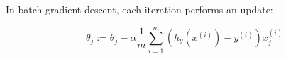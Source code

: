 \documentclass{article}
\begin{document}
{\Large


In batch gradient descent, each iteration performs an update:


\begin{equation}
 \theta_j := \theta_j - \alpha\frac{1}{m} \sum_{i=1}^m ( h_\theta (x^{(i)}) - y^{(i)} )  x_j^{(i)} 
\end{equation}

}
\end{document}
